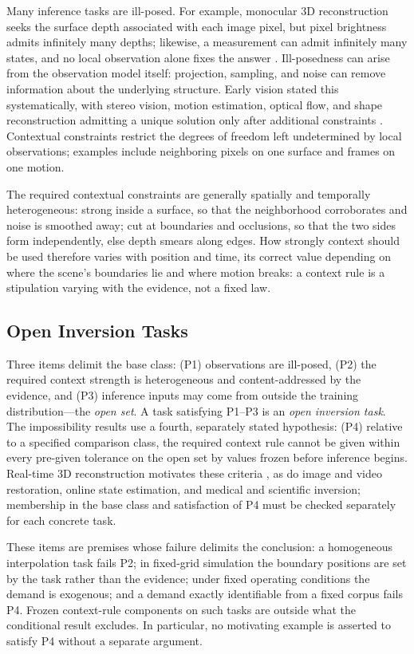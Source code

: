 \documentclass[twoside,11pt]{article}
\begin{document}
Many inference tasks are ill-posed. For example, monocular 3D reconstruction seeks the surface depth associated with each image pixel, but pixel brightness admits infinitely many depths; likewise, a measurement can admit infinitely many states, and no local observation alone fixes the answer \citep{hadamard1902}. Ill-posedness can arise from the observation model itself: projection, sampling, and noise can remove information about the underlying structure. Early vision stated this systematically, with stereo vision, motion estimation, optical flow, and shape reconstruction admitting a unique solution only after additional constraints \citep{poggio1985}. Contextual constraints restrict the degrees of freedom left undetermined by local observations; examples include neighboring pixels on one surface and frames on one motion.

The required contextual constraints are generally spatially and temporally heterogeneous: strong inside a surface, so that the neighborhood corroborates and noise is smoothed away; cut at boundaries and occlusions, so that the two sides form independently, else depth smears along edges. How strongly context should be used therefore varies with position and time, its correct value depending on where the scene's boundaries lie and where motion breaks: a context rule is a stipulation varying with the evidence, not a fixed law.

\subsection{Open Inversion Tasks}

Three items delimit the base class: (P1) observations are ill-posed, (P2) the required context strength is heterogeneous and content-addressed by the evidence, and (P3) inference inputs may come from outside the training distribution---the \emph{open set}. A task satisfying P1--P3 is an \emph{open inversion task}. The impossibility results use a fourth, separately stated hypothesis: (P4) relative to a specified comparison class, the required context rule cannot be given within every pre-given tolerance on the open set by values frozen before inference begins. Real-time 3D reconstruction motivates these criteria \citep{kerbl2023}, as do image and video restoration, online state estimation, and medical and scientific inversion; membership in the base class and satisfaction of P4 must be checked separately for each concrete task.

These items are premises whose failure delimits the conclusion: a homogeneous interpolation task fails P2; in fixed-grid simulation the boundary positions are set by the task rather than the evidence; under fixed operating conditions the demand is exogenous; and a demand exactly identifiable from a fixed corpus fails P4. Frozen context-rule components on such tasks are outside what the conditional result excludes. In particular, no motivating example is asserted to satisfy P4 without a separate argument.
\end{document}
